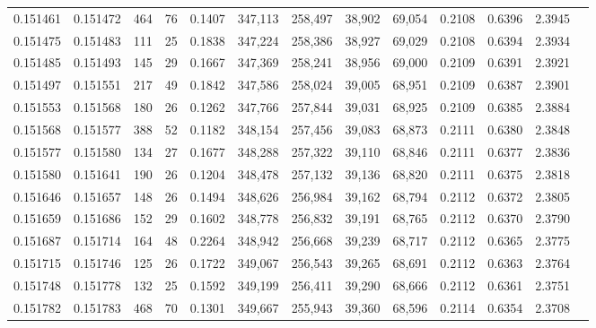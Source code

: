 \begin{tabular}{rrrrrrrrrrrrr}
0.151461 & 0.151472 &   464 &  76 &                                     0.1407 & 347,113 & 258,497 &  38,902 &  69,054 & 0.2108 & 0.6396 & 2.3945 \\
0.151475 & 0.151483 &   111 &  25 &                                     0.1838 & 347,224 & 258,386 &  38,927 &  69,029 & 0.2108 & 0.6394 & 2.3934 \\
0.151485 & 0.151493 &   145 &  29 &                                     0.1667 & 347,369 & 258,241 &  38,956 &  69,000 & 0.2109 & 0.6391 & 2.3921 \\
0.151497 & 0.151551 &   217 &  49 &                                     0.1842 & 347,586 & 258,024 &  39,005 &  68,951 & 0.2109 & 0.6387 & 2.3901 \\
0.151553 & 0.151568 &   180 &  26 &                                     0.1262 & 347,766 & 257,844 &  39,031 &  68,925 & 0.2109 & 0.6385 & 2.3884 \\
0.151568 & 0.151577 &   388 &  52 &                                     0.1182 & 348,154 & 257,456 &  39,083 &  68,873 & 0.2111 & 0.6380 & 2.3848 \\
0.151577 & 0.151580 &   134 &  27 &                                     0.1677 & 348,288 & 257,322 &  39,110 &  68,846 & 0.2111 & 0.6377 & 2.3836 \\
0.151580 & 0.151641 &   190 &  26 &                                     0.1204 & 348,478 & 257,132 &  39,136 &  68,820 & 0.2111 & 0.6375 & 2.3818 \\
0.151646 & 0.151657 &   148 &  26 &                                     0.1494 & 348,626 & 256,984 &  39,162 &  68,794 & 0.2112 & 0.6372 & 2.3805 \\
0.151659 & 0.151686 &   152 &  29 &                                     0.1602 & 348,778 & 256,832 &  39,191 &  68,765 & 0.2112 & 0.6370 & 2.3790 \\
0.151687 & 0.151714 &   164 &  48 &                                     0.2264 & 348,942 & 256,668 &  39,239 &  68,717 & 0.2112 & 0.6365 & 2.3775 \\
0.151715 & 0.151746 &   125 &  26 &                                     0.1722 & 349,067 & 256,543 &  39,265 &  68,691 & 0.2112 & 0.6363 & 2.3764 \\
0.151748 & 0.151778 &   132 &  25 &                                     0.1592 & 349,199 & 256,411 &  39,290 &  68,666 & 0.2112 & 0.6361 & 2.3751 \\
0.151782 & 0.151783 &   468 &  70 &                                     0.1301 & 349,667 & 255,943 &  39,360 &  68,596 & 0.2114 & 0.6354 & 2.3708 \\

\end{tabular}
